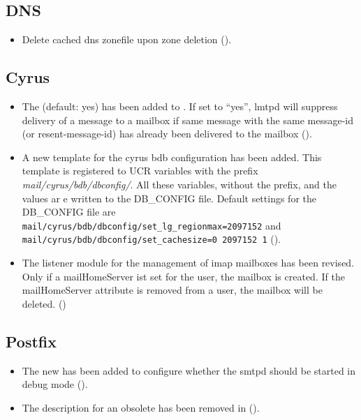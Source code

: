 
\subsection{DNS}
\begin{itemize}
\item Delete cached dns zonefile upon zone deletion ().
\end{itemize}

\subsection{Cyrus}
\begin{itemize}

\item The  (default: yes) has
been added to . If set to ``yes'', lmtpd will
suppress delivery of a message to a mailbox if same message with the same
message-id (or resent-message-id) has already
been delivered to the mailbox ().

\item A new \ucsUCR{} template  for the cyrus
bdb configuration has been added. This template is registered to
UCR variables with the prefix \emph{mail/cyrus/bdb/dbconfig/}. All
these variables, without the prefix, and the values ar e written to the
DB\_CONFIG file. Default settings for the DB\_CONFIG file are
\texttt{mail/cyrus/bdb/dbconfig/set\_lg\_regionmax=2097152} and
\texttt{mail/cyrus/bdb/dbconfig/set\_cachesize=0 2097152 1} ().

\item The listener module for the management of imap mailboxes has been
revised. Only if a mailHomeServer ist set for the user, the mailbox is
created. If the mailHomeServer attribute is removed from a user, the mailbox
will be deleted. ()

\end{itemize}

\subsection{Postfix}
\begin{itemize}

\item The new  has been added to configure
whether the smtpd should be started in debug mode ().

\item The description for an obsolete \ucsUCRV{} has been removed in
 ().

\end{itemize}

